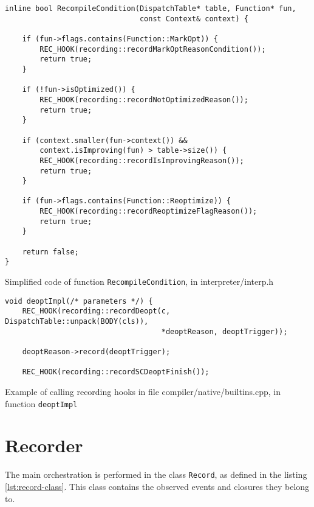 \begin{listing}
	\begin{verbatim}
inline bool RecompileCondition(DispatchTable* table, Function* fun,
                               const Context& context) {

    if (fun->flags.contains(Function::MarkOpt)) {
        REC_HOOK(recording::recordMarkOptReasonCondition());
        return true;
    }

    if (!fun->isOptimized()) {
        REC_HOOK(recording::recordNotOptimizedReason());
        return true;
    }

    if (context.smaller(fun->context()) &&
        context.isImproving(fun) > table->size()) {
        REC_HOOK(recording::recordIsImprovingReason());
        return true;
    }

    if (fun->flags.contains(Function::Reoptimize)) {
        REC_HOOK(recording::recordReoptimizeFlagReason());
        return true;
    }

    return false;
}
\end{verbatim}
	\caption{Simplified code of function \texttt{RecompileCondition}, in interpreter/interp.h}\label{lst:hook-recompile-condition}
\end{listing}



\begin{listing}
	\begin{verbatim}
void deoptImpl(/* parameters */) {
    REC_HOOK(recording::recordDeopt(c, DispatchTable::unpack(BODY(cls)),
                                    *deoptReason, deoptTrigger));

    deoptReason->record(deoptTrigger);

    REC_HOOK(recording::recordSCDeoptFinish());
  \end{verbatim}
	\caption{Example of calling recording hooks in file compiler/native/builtins.cpp, in function \texttt{deoptImpl}}\label{lst:hook-deopt}
\end{listing}


\section{Recorder}

The main orchestration is performed in the class \texttt{Record}, as defined in the listing \ref{lst:record-class}. This class contains the observed events and closures they belong to.

